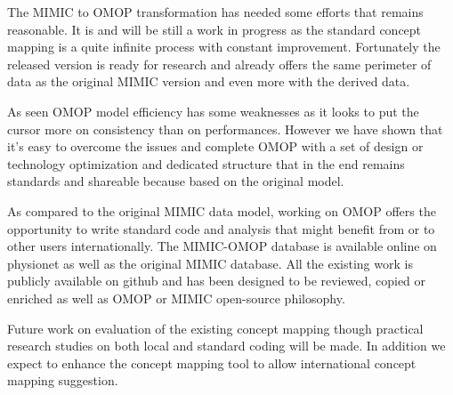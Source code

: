 The MIMIC to OMOP transformation has needed some efforts that remains
reasonable. It is and will be still a work in progress as the standard concept
mapping is a quite infinite process with constant improvement. Fortunately the
released version is ready for research and already offers the same perimeter of
data as the original MIMIC version and even more with the derived data.

As seen OMOP model efficiency has some weaknesses as it looks to put the cursor
more on consistency than on performances. However we have shown that it's easy
to overcome the issues and complete OMOP with a set of design or technology
optimization and dedicated structure that in the end remains standards and
shareable because based on the original model.

As compared to the original MIMIC data model, working on OMOP offers the
opportunity to write standard code and analysis that might benefit from or to
other users internationally. The MIMIC-OMOP database is available online on
physionet as well as the original MIMIC database. All the existing work is
publicly available on github and has been designed to be reviewed, copied or
enriched as well as OMOP or MIMIC open-source philosophy.

Future work on evaluation of the existing concept mapping though practical
research studies on both local and standard coding will be made. In addition we
expect to enhance the concept mapping tool to allow international concept
mapping suggestion.
